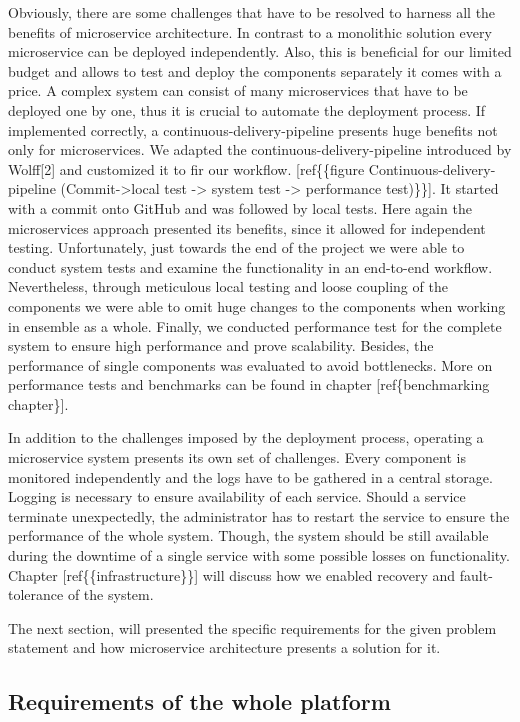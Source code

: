 Obviously, there are some challenges that have to be resolved to harness
all the benefits of microservice architecture. In contrast to a
monolithic solution every microservice can be deployed independently.
Also, this is beneficial for our limited budget and allows to test and
deploy the components separately it comes with a price. A complex system
can consist of many microservices that have to be deployed one by one,
thus it is crucial to automate the deployment process. If implemented
correctly, a continuous-delivery-pipeline presents huge benefits not
only for microservices. We adapted the continuous-delivery-pipeline
introduced by Wolff{[}2{]} and customized it to fir our workflow.
{[}ref\{\{figure Continuous-delivery-pipeline
(Commit-\textgreater{}local test -\textgreater{} system test
-\textgreater{} performance test)\}\}{]}. It started with a commit onto
GitHub and was followed by local tests. Here again the microservices
approach presented its benefits, since it allowed for independent
testing. Unfortunately, just towards the end of the project we were able
to conduct system tests and examine the functionality in an end-to-end
workflow. Nevertheless, through meticulous local testing and loose
coupling of the components we were able to omit huge changes to the
components when working in ensemble as a whole. Finally, we conducted
performance test for the complete system to ensure high performance and
prove scalability. Besides, the performance of single components was
evaluated to avoid bottlenecks. More on performance tests and benchmarks
can be found in chapter {[}ref\{benchmarking chapter\}{]}.

In addition to the challenges imposed by the deployment process,
operating a microservice system presents its own set of challenges.
Every component is monitored independently and the logs have to be
gathered in a central storage. Logging is necessary to ensure
availability of each service. Should a service terminate unexpectedly,
the administrator has to restart the service to ensure the performance
of the whole system. Though, the system should be still available during
the downtime of a single service with some possible losses on
functionality. Chapter {[}ref\{\{infrastructure\}\}{]} will discuss how
we enabled recovery and fault-tolerance of the system.

The next section, will presented the specific requirements for the given
problem statement and how microservice architecture presents a solution
for it.

\subsection{Requirements of the whole
platform}\label{requirements-of-the-whole-platform}

